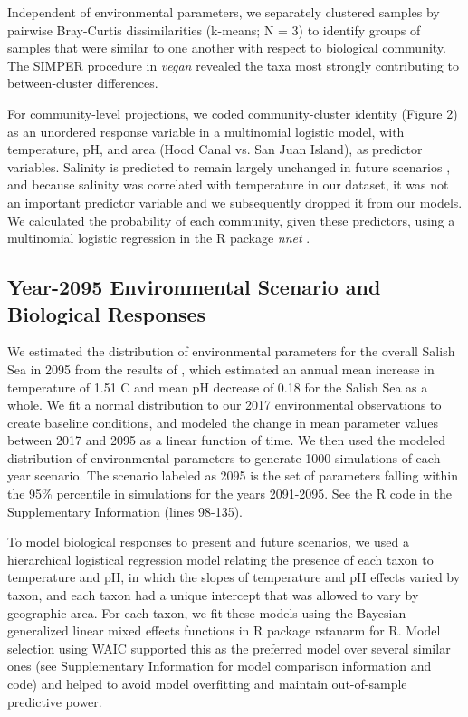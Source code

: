 \documentclass[11pt]{article}
\begin{document}
\begin{linenumbers}
Independent of environmental parameters, we separately clustered samples by pairwise Bray-Curtis dissimilarities (k-means; N = 3) to identify groups of samples that were similar to one another with respect to biological community. The SIMPER procedure in \textit{vegan} revealed the taxa most strongly contributing to between-cluster differences.

For community-level projections, we coded community-cluster identity (Figure 2) as an unordered response variable in a multinomial logistic model, with temperature, pH, and area (Hood Canal vs. San Juan Island), as predictor variables. Salinity is predicted to remain largely unchanged in future scenarios \cite{khangaonkar2019salish}, and because salinity was correlated with temperature in our dataset, it was not an important predictor variable and we subsequently dropped it from our models. We calculated the probability of each community, given these predictors, using a multinomial logistic regression in the R package \textit{nnet} \cite{nnet2002}.

\subsection*{Year-2095 Environmental Scenario and Biological Responses}

We estimated the distribution of environmental parameters for the overall Salish Sea in 2095 from the results of \cite{khangaonkar2019salish}, which estimated an annual mean increase in temperature of 1.51 \textdegree C and mean pH decrease of 0.18 for the Salish Sea as a whole. We fit a normal distribution to our 2017 environmental observations to create baseline conditions, and modeled the change in mean parameter values between 2017 and 2095 as a linear function of time. We then used the modeled distribution of environmental parameters to generate 1000 simulations of each year scenario. The scenario labeled as 2095 is the set of parameters falling within the 95\% percentile in simulations for the years 2091-2095. See the R code in the Supplementary Information (lines 98-135).

To model biological responses to present and future scenarios, we used a hierarchical logistical regression model relating the presence of each taxon to temperature and pH, in which the slopes of temperature and pH effects varied by taxon, and each taxon had a unique intercept that was allowed to vary by geographic area. For each taxon, we fit these models using the Bayesian generalized linear mixed effects functions in R package rstanarm \cite{rstanarm} for R. Model selection using WAIC \cite{watanabe2010asymptotic} supported this as the preferred model over several similar ones (see Supplementary Information for model comparison information and code) and helped to avoid model overfitting and maintain out-of-sample predictive power. 


\end{linenumbers}
\end{document}
